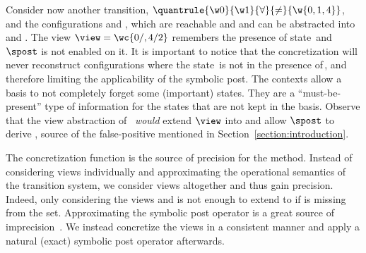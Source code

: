 Consider now another transition, %
$\quantrule{\w 0}{\w 1}{\forall}{\neq}{\w{0,1,4}}$,
%
and the configurations  and , which are
reachable and and can be abstracted into  and
. %
%
The view $\view=\wc{0/,4/2}$ remembers the presence of
state\, %
and $\spost$ is not enabled on it. 
%
It is important to notice that the concretization will never
reconstruct configurations where the state\, is not in the
presence of\,, and therefore limiting the applicability of
the symbolic post.
%
The contexts allow a basis to not completely forget some (important)
states. They are a ``must-be-present'' type of information for the
states that are not kept in the basis.
%
Observe that the view abstraction of~\cite{AbHaHo:view:abstraction}
\emph{would} extend $\view$ into  and allow $\spost$
to derive , source of the false-positive mentioned in
Section~\ref{section:introduction}.

The concretization function is the source of precision for the
method. %
Instead of considering views individually and approximating the
operational semantics of the transition system, we consider views
altogether and thus gain precision.
%
Indeed, only considering the views  and
 is not enough to extend to  if
 is missing from the set.
%
Approximating the symbolic post operator is a great source of
imprecision~\cite{AbDeRe:context:sensitive}. %
We instead concretize the views in a consistent manner and apply a
natural (exact) symbolic post operator afterwards.
